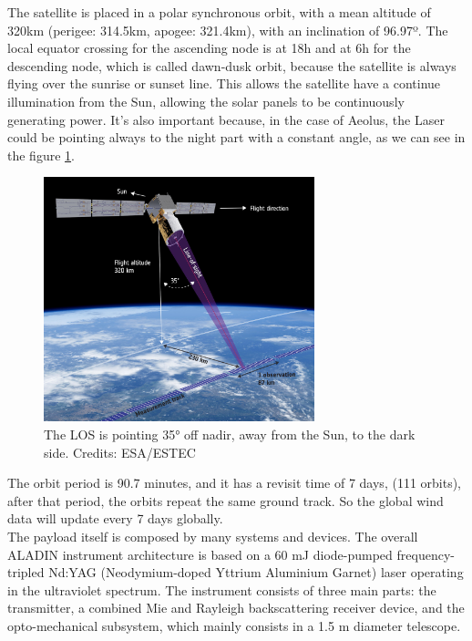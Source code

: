 The satellite is placed in a polar synchronous orbit, with a mean altitude of
320km (perigee: 314.5km, apogee: 321.4km), with an inclination of 96.97º. \cite{aeolus_n2yo.com}
The local equator crossing for the ascending node is at 18h and at 6h for the descending
node, which is called dawn-dusk orbit, because the satellite is always flying over
the sunrise or sunset line. This allows the satellite have a continue illumination from
the Sun, allowing the solar panels to be continuously generating power. It's also
important because, in the case of Aeolus, the Laser could be pointing always to the
night part with a constant angle, as we can see in the figure \ref{fig:geometry}.\\

\begin{figure}[h]
	\centering
	\includegraphics[width=0.7\textwidth]{img/geometry.jpg}
	\caption[Geometry of measurements]{The LOS is pointing 35° off nadir,
	away from the Sun, to the dark side. Credits: ESA/ESTEC \cite{geometry}}
	\label{fig:geometry}
\end{figure}

The orbit period is 90.7 minutes, and it has a revisit time of 7 days, (111 orbits),
after that period, the orbits repeat the same ground track. So the global wind data
will update every 7 days globally.\\

The payload itself is composed by many systems and devices. The overall ALADIN
instrument architecture is based on a 60 mJ diode-pumped frequency-tripled
Nd:YAG (Neodymium-doped Yttrium Aluminium Garnet) laser operating in the
ultraviolet spectrum. The instrument consists of three main parts: the transmitter,
a combined Mie and Rayleigh backscattering receiver device, and the opto-mechanical
subsystem, which mainly consists in a 1.5 m diameter telescope.\\

